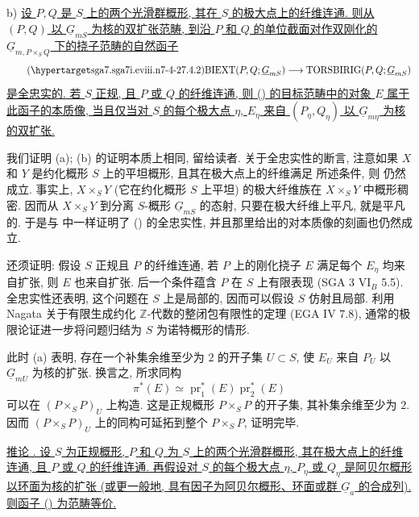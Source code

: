 \smallskip
\noindent b) \underline{设 $P,Q$ 是 $S$ 上的两个光滑群概形, 其在 $S$ 的极大点上的纤维连通. 则从 $(P,Q)$ 以 $\underline G_{mS}$ 为核的双扩张范畴, 到沿 $P$ 和 $Q$ 的单位截面对作双刚化的 $\underline G_{m,P\times_S Q}$ 下的挠子范畴的自然函子}
\begin{equation}\tag{\SGARefTarget{sga7.sga7i.eviii.n7-4-2}{7.4.2}}
 \mathrm{BIEXT}(P,Q;\underline G_{mS})
 \longrightarrow
 \mathrm{TORSBIRIG}(P,Q;\underline G_{mS})
\end{equation}
\underline{是全忠实的. 若 $S$ 正规, 且 $P$ 或 $Q$ 的纤维连通, 则 () 的目标范畴中的对象 $E$ 属于此函子的本质像, 当且仅当对 $S$ 的每个极大点 $\eta$, $E_\eta$ 来自 $(P_\eta,Q_\eta)$ 以 $\underline G_{m\eta}$ 为核的双扩张.}

我们证明 (a); (b) 的证明本质上相同, 留给读者. 关于全忠实性的断言, 注意如果 $X$ 和 $Y$ 是约化概形 $S$ 上的平坦概形, 且其在极大点上的纤维满足  所述条件, 则  仍然成立. 事实上, $X\times_S Y$ (它在约化概形 $S$ 上平坦) 的极大纤维族在 $X\times_S Y$ 中概形稠密. 因而从 $X\times_S Y$ 到分离 $S$-概形 $\underline G_{mS}$ 的态射, 只要在极大纤维上平凡, 就是平凡的. 于是与  中一样证明了 () 的全忠实性, 并且那里给出的对本质像的刻画也仍然成立.

还须证明: 假设 $S$ 正规且 $P$ 的纤维连通, 若 $P$ 上的刚化挠子 $E$ 满足每个 $E_\eta$ 均来自扩张, 则 $E$ 也来自扩张. 后一个条件蕴含 $P$ 在 $S$ 上有限表现 (SGA 3 $\mathrm{VI}_B$ 5.5). 全忠实性还表明, 这个问题在 $S$ 上是局部的, 因而可以假设 $S$ 仿射且局部. 利用 Nagata 关于有限生成约化 $\mathbb Z$-代数的整闭包有限性的定理 (EGA IV 7.8), 通常的极限论证进一步将问题归结为 $S$ 为诺特概形的情形.

此时 (a) 表明, 存在一个补集余维至少为 $2$ 的开子集 $U\subset S$, 使 $E_U$ 来自 $P_U$ 以 $\underline G_{mU}$ 为核的扩张. 换言之, 所求同构
\[
 \pi^*(E)\simeq
 \operatorname{pr}_1^*(E)\operatorname{pr}_2^*(E)
\]
可以在 $(P\times_S P)_U$ 上构造. 这是正规概形 $P\times_S P$ 的开子集, 其补集余维至少为 $2$. 因而 $(P\times_S P)_U$ 上的同构可延拓到整个 $P\times_S P$, 证明完毕.

\medskip
\noindent\underline{推论 . 设 $S$ 为正规概形, $P$ 和 $Q$ 为 $S$ 上的两个光滑群概形, 其在极大点上的纤维连通, 且 $P$ 或 $Q$ 的纤维连通. 再假设对 $S$ 的每个极大点 $\eta$, $P_\eta$ 或 $Q_\eta$ 是阿贝尔概形以环面为核的扩张 (或更一般地, 具有因子为阿贝尔概形、环面或群 $\underline G_a$ 的合成列). 则函子 () 为范畴等价.}

